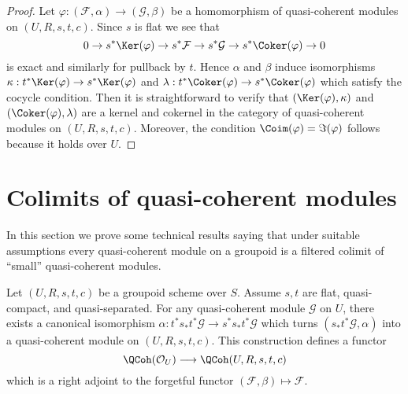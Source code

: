 \begin{proof}
Let $\varphi : (\mathcal{F}, \alpha) \to (\mathcal{G}, \beta)$ be a
homomorphism of quasi-coherent modules on $(U, R, s, t, c)$. Since
$s$ is flat we see that
$$
0 \to s^*\Ker(\varphi)
\to s^*\mathcal{F} \to s^*\mathcal{G} \to s^*\Coker(\varphi) \to 0
$$
is exact and similarly for pullback by $t$. Hence $\alpha$ and $\beta$
induce isomorphisms
$\kappa : t^*\Ker(\varphi) \to s^*\Ker(\varphi)$ and
$\lambda : t^*\Coker(\varphi) \to s^*\Coker(\varphi)$
which satisfy the cocycle condition. Then it is straightforward to
verify that $(\Ker(\varphi), \kappa)$ and
$(\Coker(\varphi), \lambda)$ are a kernel and cokernel in the
category of quasi-coherent modules on $(U, R, s, t, c)$. Moreover,
the condition $\Coim(\varphi) = \Im(\varphi)$ follows
because it holds over $U$.
\end{proof}













\section{Colimits of quasi-coherent modules}
\label{section-colimits}

\noindent
In this section we prove some technical results saying that under
suitable assumptions every quasi-coherent module on a groupoid is
a filtered colimit of ``small'' quasi-coherent modules.

\begin{lemma}
\label{lemma-construct-quasi-coherent}
Let $(U, R, s, t, c)$ be a groupoid scheme over $S$.
Assume $s, t$ are flat, quasi-compact, and quasi-separated.
For any quasi-coherent module $\mathcal{G}$ on $U$, there exists
a canonical isomorphism
$\alpha : t^*s_*t^*\mathcal{G} \to s^*s_*t^*\mathcal{G}$
which turns $(s_*t^*\mathcal{G}, \alpha)$ into a quasi-coherent module
on $(U, R, s, t, c)$. This construction defines a functor
$$
\QCoh(\mathcal{O}_U) \longrightarrow \QCoh(U, R, s, t, c)
$$
which is a right adjoint to the forgetful functor
$(\mathcal{F}, \beta) \mapsto \mathcal{F}$.
\end{lemma}

